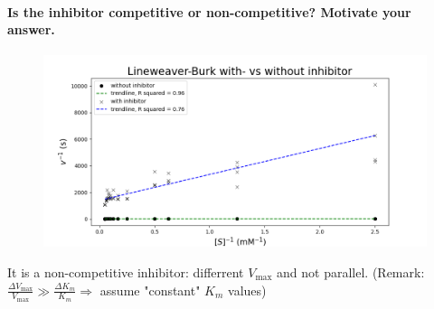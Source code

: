 \documentclass[a4paper,12pt]{article}
\begin{document}
\paragraph{Is the inhibitor competitive or non-competitive? Motivate your answer.}

\begin{figure}[htb]
    \includegraphics[scale=0.4]{fig3_6.png}
    \centering
\end{figure}

It is a non-competitive inhibitor: differrent $V_{\text{max}}$ and not parallel. (Remark: $\frac{\Delta V_{\text{max}}}{V_{\text{max}}} \gg \frac{\Delta K_m}{K_m} \Rightarrow$ assume "constant" $K_m$ values)
\end{document}
